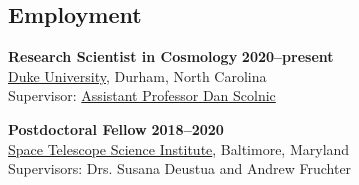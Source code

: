 \documentclass[margin]{res}
\begin{document}
\begin{resume}

\section{Employment} 

{\bf Research Scientist in Cosmology} \hfill {\bf 2020--present}\\
\href{https://phy.duke.edu}{Duke University}, Durham, North Carolina\\ 
Supervisor: \href{https://phy.duke.edu/people/daniel-m-scolnic}{Assistant Professor Dan Scolnic}

{\bf Postdoctoral Fellow} \hfill {\bf 2018--2020}\\
\href{http://www.stsci.edu}{Space Telescope Science Institute}, Baltimore, Maryland\\ 
Supervisors: Drs. Susana Deustua and Andrew Fruchter




 





\end{resume}
\end{document}
